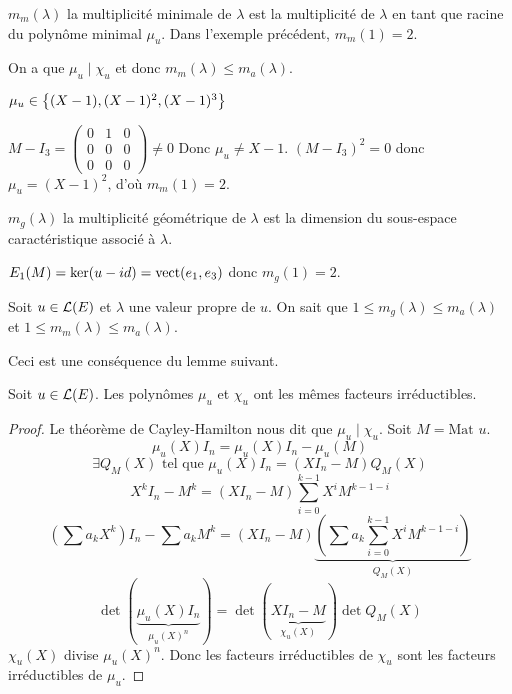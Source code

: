 $m_m(\lambda)$ la multiplicité minimale de $\lambda$ est la multiplicité de $\lambda$ en tant que racine du polynôme minimal $\mu_u$.
Dans l'exemple précédent, $m_m(1) = 2$.

On a que $\mu_u \mid \chi_u$ et donc $m_m(\lambda) \leq m_a(\lambda)$.

$\mu_u \in  \left\{(X-1), (X-1)^2, (X-1)^3\right\}$

$M - I_3 = \begin{pmatrix}
		0 & 1 & 0 \\ 0 & 0 & 0 \\ 0 & 0 & 0
	\end{pmatrix} \neq 0$ Donc $\mu_u \neq X - 1$.
$(M - I_3)^2 = 0$ donc $\mu_u = (X-1)^2$, d'où $m_m(1) = 2$.


$m_g(\lambda)$ la multiplicité géométrique de $\lambda$ est la dimension du sous-espace caractéristique associé à $\lambda$.

$E_1 (M) = \ker (u-id) = \text{vect} (e_1, e_3)$ donc $m_g(1) = 2$.


\begin{prop}
	Soit $u \in \mathcal{L}(E)$ et $\lambda$ une valeur propre de $u$. On sait que $ 1 \leq m_g(\lambda) \leq m_a(\lambda)$ et $1 \leq m_m(\lambda) \leq m_a(\lambda)$.

	Ceci est une conséquence du lemme suivant.
\end{prop}

\begin{lemma}
	Soit $u \in \mathcal{L}(E)$. Les polynômes $\mu_u$ et $\chi_u$ ont les mêmes facteurs irréductibles.
\end{lemma}

\begin{proof}
	Le théorème de Cayley-Hamilton nous dit que $\mu_u \mid \chi_u$. Soit $M = \text {Mat } u$.
	$$\mu_u(X)I_n = \mu_u(X)I_n - \mu_u(M)$$
	$$\exists Q_M (X) \text{ tel que } \mu_u(X) I_n = (XI_n-M)Q_M(X)$$
	$$ X^k I_n - M^k = (XI_n - M) \sum_{i=0}^{k-1} X^i M^{k-1-i} $$
	$$ (\sum a_k X^k)I_n - \sum a_k M^k =(XI_n-M)\underbrace{(\sum a_k \sum_{i=0}^{k-1}X^iM^{k-1-i})}_{Q_M(X)}$$
	$$ \det (\underbrace{\mu_u(X) I_n}_{\mu_u(X)^n}) = \det (\underbrace{XI_n-M}_{\chi_u(X)})\det Q_M(X) $$
	$\chi_u(X)$ divise $\mu_u(X)^n$.
	Donc les facteurs irréductibles de $\chi_u$ sont les facteurs irréductibles de $\mu_u$.

\end{proof}








